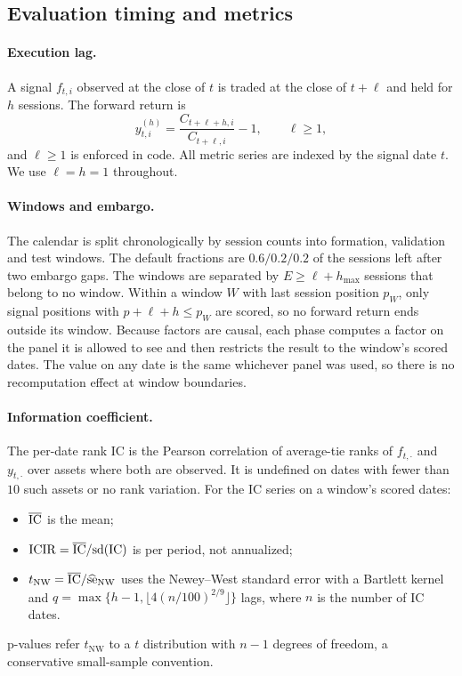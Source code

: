\subsection{Evaluation timing and metrics}
\label{sec:metrics}

\paragraph{Execution lag.} A signal $f_{t,i}$ observed at the close of $t$ is
traded at the close of $t+\ell$ and held for $h$ sessions. The forward
return is
\[
y^{(h)}_{t,i}=\frac{C_{t+\ell+h,i}}{C_{t+\ell,i}}-1,\qquad \ell\ge 1,
\]
and $\ell\ge1$ is enforced in code. All metric series are indexed by the
signal date $t$. We use $\ell=h=1$ throughout.

\paragraph{Windows and embargo.} The calendar is split chronologically by
session counts into formation, validation and test windows. The default
fractions are $0.6/0.2/0.2$ of the sessions left after two embargo gaps. The
windows are separated by $E\ge\ell+h_{\max}$ sessions that belong to no
window. Within a window $W$ with last session position $p_W$, only signal
positions with $p+\ell+h\le p_W$ are scored, so no forward return ends
outside its window. Because factors are causal, each phase computes a factor
on the panel it is allowed to see and then restricts the result to the
window's scored dates. The value on any date is the same whichever panel was
used, so there is no recomputation effect at window boundaries.

\paragraph{Information coefficient.} The per-date rank IC is the Pearson
correlation of average-tie ranks of $f_{t,\cdot}$ and $y_{t,\cdot}$ over
assets where both are observed. It is undefined on dates with fewer than
$10$ such assets or no rank variation. For the IC series on a window's
scored dates:
\begin{itemize}
  \item $\overline{\mathrm{IC}}$ is the mean;
  \item $\mathrm{ICIR}=\overline{\mathrm{IC}}/\mathrm{sd}(\mathrm{IC})$ is per period, not
    annualized;
  \item $t_{\mathrm{NW}}=\overline{\mathrm{IC}}/\widehat{\mathrm{se}}_{\mathrm{NW}}$
    uses the Newey--West standard error with a Bartlett
    kernel~\citep{newey1987hac} and $q=\max\{h-1,\lfloor 4(n/100)^{2/9}\rfloor\}$
    lags, where $n$ is the number of IC dates.
\end{itemize}
p-values refer $t_{\mathrm{NW}}$ to a $t$ distribution with $n-1$ degrees of
freedom, a conservative small-sample convention.

